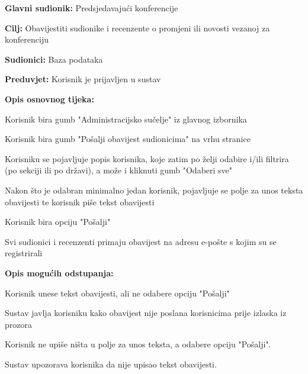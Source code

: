 				
					\noindent {}
					\begin{packed_item}
						\item \textbf{Glavni sudionik:} Predsjedavajući konferencije
						\item \textbf{Cilj:} Obavijestiti  sudionike i recenzente o promjeni ili novosti vezanoj za konferenciju
						\item \textbf{Sudionici:} Baza podataka
						\item \textbf{Preduvjet:} Korisnik je prijavljen u sustav
						
						\item \textbf{Opis osnovnog tijeka:} 
						\item[] \begin{packed_enum}
							\item Korisnik bira gumb "Administracijsko sučelje" iz glavnog izbornika
							\item Korisnik bira gumb "Pošalji obavijest sudionicima" na vrhu stranice
							\item Korisniku se pojavljuje popis korisnika, koje zatim po želji odabire i/ili filtrira (po sekciji ili po državi), a može i kliknuti gumb "Odaberi sve"
							\item Nakon što je odabran minimalno jedan korisnik, pojavljuje se polje za unos teksta obavijesti te korisnik piše tekst obavijesti
							\item Korisnik bira opciju "Pošalji"
							\item Svi sudionici i recenzenti primaju obavijest na adresu e-pošte s kojim su se registrirali
						\end{packed_enum}
					
						\item \textbf{Opis mogućih odstupanja:}
						\item[] \begin{packed_enum}
							
		

							\item[5.a] Korisnik unese tekst obavijesti, ali ne odabere opciju "Pošalji"
							\item[] \begin{packed_enum}
								\item[1.] Sustav javlja korisniku kako obavijest nije poslana korisnicima prije izlaska iz prozora
							\end{packed_enum}
							\item[5.b] Korisnik ne upiše ništa u polje za unos teksta, a odabere opciju "Pošalji".
							\item[] \begin{packed_enum}
								\item[1.] Sustav upozorava korisnika da nije upisao tekst obavijesti.
							\end{packed_enum}
							
						\end{packed_enum}
					\end{packed_item}
				


